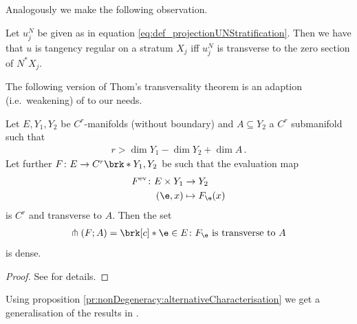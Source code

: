 Analogously we make the following observation.
\begin{proposition}\label{pr:tanRegular_alternativeCharacterisation}
  Let $u^N_j$ be given as in equation \eqref{eq:def_projectionUNStratification}.
  Then we have that $u$ is tangency regular on a stratum $X_j$ iff
   $u^N_j$ is transverse to the zero section of $N^*X_j$.
\end{proposition}
The following version of Thom's transversality theorem is an adaption (i.e.\ weakening) of \cite[Theorem 2.7]{Hirsch1994} to our needs.
\begin{theorem}
  Let $E,Y_1,Y_2$ be $C^r$-manifolds (without boundary) and $A\subseteq Y_2$ a $C^r$ submanifold such that
  \begin{align*}
    r>\dim Y_1-\dim Y_2+\dim A\,.
  \end{align*}
  Let further $F\colon E\to C^r\brk*{Y_1,Y_2}$ be such that the evaluation map
  \begin{align*}
    F^\text{ev}\colon E\times Y_1&\to Y_2 \\
    (\e,x)&\mapsto F_\e(x)
  \end{align*}
  is $C^r$ and transverse to $A$.
  Then the set
  \begin{align*}
    \pitchfork(F;A)=\brk[c]*{\e\in E\colon F_\e\text{ is transverse to } A}
  \end{align*}
  is dense.
\end{theorem}
\begin{proof}
  See \cite[Theorem 2.7]{Hirsch1994} for details.
\end{proof}
Using proposition \ref{pr:nonDegeneracy:alternativeCharacterisation} 
we get a generalisation of the results in \cite[§2]{Morse1970}.
